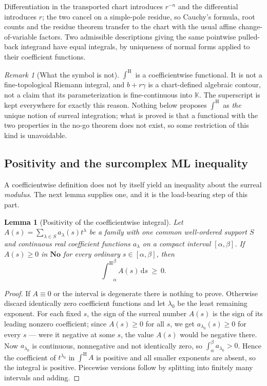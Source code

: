\documentclass[11pt,a4paper]{article}
\numberwithin{equation}{section}
\newtheorem{lemma}[theorem]{Lemma}
\theoremstyle{definition}
\theoremstyle{remark}
\newtheorem{remark}[theorem]{Remark}
\theoremstyle{plain}
\newcommand{\K}{\mathbb K}
\newcommand{\No}{\mathbf{No}}
\newcommand{\tm}{t}
\newcommand{\intH}{{\int^{\mathrm H}}}
\newcommand{\dd}{\mathrm d}
\begin{document}
Differentiation in the transported chart introduces $r^{-n}$ and the
differential introduces $r$; the two cancel on a simple-pole residue, so
Cauchy's formula, root counts and the residue theorem transfer to the
chart with the usual affine change-of-variable factors. Two admissible
descriptions giving the same pointwise pulled-back integrand have equal
integrals, by uniqueness of normal forms applied to their coefficient
functions.

\begin{remark}[What the symbol is not]\label{c:p5:rk-notriemann}
$\intH$ is a coefficientwise functional. It is not a fine-topological
Riemann integral, and $b+r\gamma$ is a chart-defined algebraic contour,
not a claim that its parameterization is fine-continuous into $\K$. The
superscript is kept everywhere for exactly this reason. Nothing below
proposes $\intH$ as \emph{the} unique notion of surreal integration;
what is proved is that a functional with the two properties in the no-go
theorem does not exist, so some restriction of this kind is unavoidable.
\end{remark}

\subsection{Positivity and the surcomplex ML inequality}
\label{c:p5:MLsec}

A coefficientwise definition does not by itself yield an inequality
about the surreal \emph{modulus}. The next lemma supplies one, and it is
the load-bearing step of this part.

\begin{lemma}[Positivity of the coefficientwise integral]
\label{c:p5:positivity}
Let $A(s)=\sum_{\lambda\in S}a_\lambda(s)\tm^{\lambda}$ be a family with
one common well-ordered support $S$ and continuous \emph{real}
coefficient functions $a_\lambda$ on a compact interval $[\alpha,\beta]$.
If $A(s)\ge0$ in $\No$ for every ordinary $s\in[\alpha,\beta]$, then
\[
 \intH_{\alpha}^{\beta}A(s)\,\dd s\ \ge\ 0 .
\]
\end{lemma}

\begin{proof}
If $A\equiv0$ or the interval is degenerate there is nothing to prove.
Otherwise discard identically zero coefficient functions and let
$\lambda_0$ be the least remaining exponent. For each fixed $s$, the sign of the
surreal number $A(s)$ is the sign of its leading nonzero coefficient;
since $A(s)\ge0$ for all $s$, we get $a_{\lambda_0}(s)\ge0$ for every
$s$ --- were it negative at some $s$, the value $A(s)$ would be negative
there. Now $a_{\lambda_0}$ is continuous, nonnegative and not identically
zero, so $\int_\alpha^\beta a_{\lambda_0}>0$. Hence the coefficient of
$\tm^{\lambda_0}$ in $\intH A$ is positive and all smaller exponents are
absent, so the integral is positive. Piecewise versions follow by
splitting into finitely many intervals and adding.
\end{proof}
\end{document}
